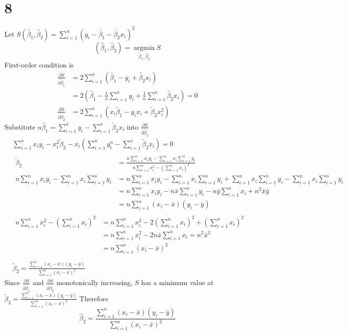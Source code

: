 \documentclass[a4paper,11pt]{article}
\begin{document}
\section*{8}
Let $S\left(\tilde{\beta_1}, \tilde{\beta_2}\right)=\sum_{i=1}^n\left(y_i-\tilde{\beta_1}-\tilde{\beta_2} x_i\right)^2$
$$
\left(\hat{\beta}_1, \hat{\beta}_2\right)=\underset{\tilde{\beta}_1, \hat{\beta}_2}{\operatorname{argmin}} S
$$
First-order condition is
$$
\begin{aligned}
\frac{\partial S}{\partial \tilde{\beta}_1} & =2 \sum_{i=1}^n\left(\tilde{\beta_1}-y_i+\tilde{\beta_2} x_i\right) \\
& =2\left(\tilde{\beta_1}-\frac{1}{n} \sum_{i=1}^n y_i+\frac{1}{n} \sum_{i=1}^n \tilde{\beta_2} x_i\right)=0 \\
\frac{\partial S}{\partial \tilde{\beta}_2} & =2 \sum_{i=1}^n\left(x_i \tilde{\beta}_1-y_i x_i+\tilde{\beta}_2 x_i^2\right)
\end{aligned}
$$
Substitute $n \tilde{\beta_1}=\sum_{i=1}^n y_i-\sum_{i=1}^n \tilde{\beta}_2 x_i$ into $\frac{\partial S}{\partial \tilde{\beta}_2}$
$$
\begin{aligned}
& \sum_{i=1}^n x_i y_i-x_i^2 \tilde{\beta}_2-x_i\left(\sum_{i=1}^n y_i^n-\sum_{i=1}^n \tilde{\beta}_2 x_i\right)=0 \\
& \begin{aligned}
\tilde{\beta}_2 & =\frac{n \sum_{i=1}^n x_1 y_i-\sum_{i=1}^n x_i \sum_{i=1}^n y_i}{n \sum_{i=1}^n x_i^2-\left(\sum_{i=1}^n x_i\right)^2} \\
n \sum_{i=1}^n x_i y_i-\sum_{i=1}^n x_i \sum_{i=1}^n y_i & =n \sum_{i=1}^n x_i y_i-\sum_{i=1}^n x_i \sum_{i=1}^n y_i+\sum_{i=1}^n x_i \sum_{i=1}^n y_i-\sum_{i=1}^n x_i \sum_{i=1}^n y_i \\
& =n \sum_{i=1}^n x_i y_i-n \bar{x} \sum_{i=1}^n y_i - n \bar{y} \sum_{i=1}^n x_i+n^2 \bar{x} \bar{y} \\
& =n \sum_{i=1}^n\left(x_i-\bar{x}\right)\left(y_i-\bar{y}\right)
\end{aligned} \\
& \begin{aligned}
n \sum_{i=1}^n x_i^2-\left(\sum_{i=1}^n x_i\right)^2 & =n \sum_{i=1}
^n x_i^2-2\left(\sum_{i=1}^n x_i\right)^2+\left(\sum_{i=1}^n x_i\right)^2 \\
& =n \sum_{i=1}^n x_i^2-2 n \bar{x} \sum_{i=1}^n x_i=n^2 \bar{x}^2 \\
& =n \sum_{i=1}^n\left(x_i-\bar{x}\right)^2 \\
\end{aligned} \\
& \tilde{\beta}_2=\frac{\sum_{i=1}^n\left(x_i-\bar{x}\right)\left(y_i-\bar{y}\right)}{\sum_{i=1}^n\left(x_i-\bar{x}\right)^2}
\end{aligned}
$$
Since $\frac{\partial S}{\partial \tilde{\beta}_1}$ and $\frac{\partial S}{\partial \tilde{\beta}_2}$ monotonically increasing, $S$ has a minimum value at $\tilde{\beta}_2=\frac{\sum_{i=1}^n\left(x_i-\bar{x}\right)\left(y_i-\bar{y}\right)}{\sum_{i=1}^n\left(x_i-\bar{x}\right)^2}$
Therefore 
$$
\hat{\beta}_2=\frac{\sum_{i=1}^n\left(x_i-\bar{x}\right)\left(y_i-\bar{y}\right)}{\sum_{i=1}^n\left(x_i-\bar{x}\right)^2}
$$
\end{document}
